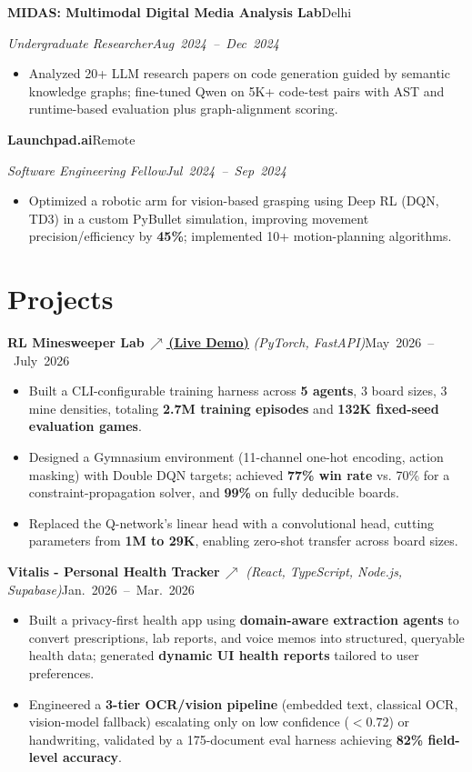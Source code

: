 \documentclass[10pt,letterpaper]{article}
\newcommand{\resumeHeading}[4]{%
  \par\noindent\textbf{#1}\hfill\mbox{#2}\par
  \noindent\textit{#3}\hfill\mbox{\textit{#4}}\par
}
\newcommand{\projectHeading}[3]{%
  \par\noindent\textbf{#1} \textit{(#2)}\hfill\mbox{#3}\par
}
\begin{document}
\resumeHeading{MIDAS: Multimodal Digital Media Analysis Lab}{Delhi}{Undergraduate Researcher}{Aug 2024 -- Dec 2024}
\begin{itemize}
\item Analyzed 20+ LLM research papers on code generation guided by semantic knowledge graphs; fine-tuned Qwen on 5K+ code-test pairs with AST and runtime-based evaluation plus graph-alignment scoring.
\end{itemize}

\resumeHeading{Launchpad.ai}{Remote}{Software Engineering Fellow}{Jul 2024 -- Sep 2024}
\begin{itemize}
\item Optimized a robotic arm for vision-based grasping using Deep RL (DQN, TD3) in a custom PyBullet simulation, improving movement precision/efficiency by \textbf{45\%}; implemented 10+ motion-planning algorithms.
\end{itemize}

\section{Projects}
\projectHeading{RL Minesweeper Lab\,\href{https://rl-minesweeper-lab.vercel.app/}{\textnormal{\scriptsize$\nearrow$\,\normalsize (Live Demo)}}}{PyTorch, FastAPI}{May 2026 -- July 2026}
\begin{itemize}
  \item Built a CLI-configurable training harness across \textbf{5 agents}, 3 board sizes, 3 mine densities, totaling \textbf{2.7M training episodes} and \textbf{132K fixed-seed evaluation games}.
  \item Designed a Gymnasium environment (11-channel one-hot encoding, action masking) with Double DQN targets; achieved \textbf{77\% win rate} vs. 70\% for a constraint-propagation solver, and \textbf{99\%} on fully deducible boards.
  \item Replaced the Q-network's linear head with a convolutional head, cutting parameters from \textbf{1M to 29K}, enabling zero-shot transfer across board sizes.
\end{itemize}

\projectHeading{Vitalis - Personal Health Tracker\,\href{https://vitalis-aitracker.vercel.app/}{\scriptsize$\nearrow$}}{React, TypeScript, Node.js, Supabase}{Jan. 2026 -- Mar. 2026}
\begin{itemize}
  \item Built a privacy-first health app using \textbf{domain-aware extraction agents} to convert prescriptions, lab reports, and voice memos into structured, queryable health data; generated \textbf{dynamic UI health reports} tailored to user preferences.
  \item Engineered a \textbf{3-tier OCR/vision pipeline} (embedded text, classical OCR, vision-model fallback) escalating only on low confidence ($<0.72$) or handwriting, validated by a 175-document eval harness achieving \textbf{82\% field-level accuracy}.
\end{itemize}
\end{document}
